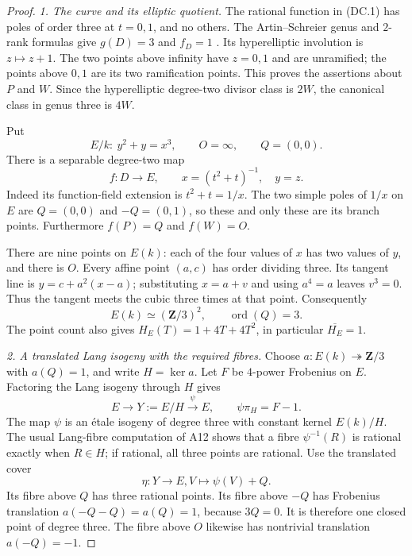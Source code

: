 \documentclass[11pt,a4paper]{article}
\begin{document}
\begin{proof}
\emph{1. The curve and its elliptic quotient.}
The rational function in (DC.1) has poles of order three
at $t=0,1$, and no others.  The Artin--Schreier genus and
$2$-rank formulas give $g(D)=3$ and $f_D=1$
\cite[Lemma~2.6, p.~712]{PriesZhu2012}.
Its hyperelliptic involution is $z\mapsto z+1$.
The two points above infinity have $z=0,1$ and are
unramified; the points above $0,1$ are its two ramification
points.  This proves the assertions about $P$ and $W$.
Since the hyperelliptic degree-two divisor class is $2W$,
the canonical class in genus three is $4W$.

Put
\[
 E/k:\ y^2+y=x^3,\qquad O=\infty,\qquad Q=(0,0).
\]
There is a separable degree-two map
\[
 f:D\longrightarrow E,\qquad
                 x=(t^2+t)^{-1},\quad y=z.
\tag{DC.4}
\]
Indeed its function-field extension is
$t^2+t=1/x$.  The two simple poles of $1/x$ on $E$ are
$Q=(0,0)$ and $-Q=(0,1)$, so these and only these are its
branch points.  Furthermore $f(P)=Q$ and $f(W)=O$.

There are nine points on $E(k)$: each of the four values
of $x$ has two values of $y$, and there is $O$.
Every affine point $(a,c)$ has order dividing three.
Its tangent line is $y=c+a^2(x-a)$; substituting
$x=a+v$ and using $a^4=a$ leaves $v^3=0$.
Thus the tangent meets the cubic three times at that point.
Consequently
\[
              E(k)\simeq(\mathbf Z/3)^2,
              \qquad \operatorname{ord}(Q)=3.
\tag{DC.5}
\]
The point count also gives
$H_E(T)=1+4T+4T^2$, in particular $\overline{H_E}=1$.

\emph{2. A translated Lang isogeny with the required fibres.}
Choose $a:E(k)\twoheadrightarrow\mathbf Z/3$ with $a(Q)=1$,
and write $H=\ker a$.
Let $F$ be $4$-power Frobenius on $E$.  Factoring the Lang
isogeny through $H$ gives
\[
 E\longrightarrow Y:=E/H\xrightarrow{\psi}E,
             \qquad \psi\pi_H=F-1.
\tag{DC.6}
\]
The map $\psi$ is an \'etale isogeny of degree three with
constant kernel $E(k)/H$.  The usual Lang-fibre computation
of A12 shows that a fibre $\psi^{-1}(R)$ is rational exactly
when $R\in H$; if rational, all three points are rational.
Use the translated cover
\[
                  \eta:Y\longrightarrow E,
                           V\longmapsto\psi(V)+Q.
\tag{DC.7}
\]
Its fibre above $Q$ has three rational points.  Its fibre
above $-Q$ has Frobenius translation
$a(-Q-Q)=a(Q)=1$, because $3Q=0$.
It is therefore one closed point of degree three.
The fibre above $O$ likewise has nontrivial translation
$a(-Q)=-1$.


\end{proof}
\end{document}
